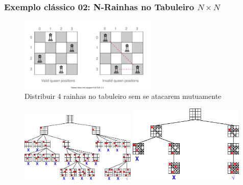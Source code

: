 \documentclass{beamer}
\begin{document}
\begin{frame}[fragile, allowframebreaks=0.9]

\frametitle{Exemplo  clássico  02: N-Rainhas no Tabuleiro $N\times N$}

\begin{figure}[!htb]
\begin{center}
\includegraphics[width=0.580\textwidth, height=0.40\textheight]{figures/4_queens.pdf}
\caption{Distribuir 4 rainhas no tabuleiro sem se atacarem mutuamente}
\end{center}
\end{figure}



\begin{figure}[!htb]
\begin{center}
\includegraphics[width=0.490\textwidth, height=0.5\textheight]{figures/4_rainhas_01.jpg}
\hfill
\includegraphics[width=0.490\textwidth, height=0.45\textheight]{figures/4_rainhas_02.jpg}
\end{center}
\end{figure}


\end{frame}
\end{document}
